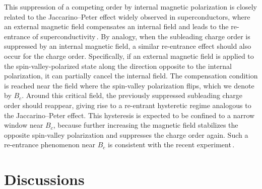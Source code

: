 \documentclass[aps,prx,article,twocolumn,amsmath,amssymb,superscriptaddress,longbibliography]{revtex4-2}
\begin{document}
This suppression of a competing order by internal magnetic polarization is closely related to the Jaccarino--Peter effect widely observed in superconductors, where an external magnetic field compensates an internal field and leads to the re-entrance of superconductivity\,\cite{jaccarino1962ultra,meul1984observation,ran2019extreme,helm2024field,yang2026field,vu2026re}. By analogy, when the subleading charge order is suppressed by an internal magnetic field, a similar re-entrance effect should also occur for the charge order. Specifically, if an external magnetic field is applied to the spin-valley-polarized state along the direction opposite to the internal polarization, it can partially cancel the internal field. The compensation condition is reached near the field where the spin-valley polarization flips, which we denote by $B_c$. Around this critical field, the previously suppressed subleading charge order should reappear, giving rise to a re-entrant hysteretic regime analogous to the Jaccarino--Peter effect. This hysteresis is expected to be confined to a narrow window near $B_c$, because further increasing the magnetic field stabilizes the opposite spin-valley polarization and suppresses the charge order again. Such a re-entrance phenomenon near $B_c$ is consistent with the recent experiment\,\cite{zhao2026hysteretical}.




\section{Discussions}
\end{document}
